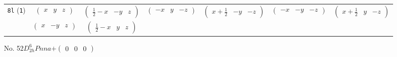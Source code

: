\documentclass[fleqn,9pt,landscape]{jsarticle}
\begin{document}
\begin{center}
\begin{longtable}{ccccccc}
{\tt 8l} ({\tt 1}) & $ \begin{pmatrix} x & y & z \end{pmatrix} $ & $ \begin{pmatrix} \frac{1}{2} - x & - y & z \end{pmatrix} $ & $ \begin{pmatrix} - x & y & - z \end{pmatrix} $ & $ \begin{pmatrix} x + \frac{1}{2} & - y & - z \end{pmatrix} $ & $ \begin{pmatrix} - x & - y & - z \end{pmatrix} $ & $ \begin{pmatrix} x + \frac{1}{2} & y & - z \end{pmatrix} $ \\
& $ \begin{pmatrix} x & - y & z \end{pmatrix} $ & $ \begin{pmatrix} \frac{1}{2} - x & y & z \end{pmatrix} $ & $  $ & $  $ & $  $ & $  $ \\
\end{longtable}
\end{center}
\newpage
No. 52\quad$D_{2h}^{6}$\quad$Pnna$\quad[ orthorhombic ]\quad$+\begin{pmatrix} 0 & 0 & 0 \end{pmatrix}$
\end{document}

